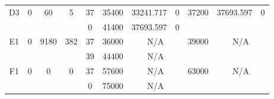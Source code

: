\begin{sidewaystable}
\begin{tabular}{c||c|c|c||c|c|c|c||c|c|c}
         &
        
      \\
      \hline
      \multirow{2}{*}{D3} &
      \multirow{2}{*}{0} &
      \multirow{2}{*}{60} &
      \multirow{2}{*}{5} &
      37 &
      35400 &
        33241.717 &
        0 &
      \multirow{2}{*}{37200} &
        \multirow{2}{*}{37693.597} &
        \multirow{2}{*}{0}
      \\
      \cline{5-8}
       &
       &
       &
       &
      0 &
      41400 &
        37693.597 &
        0 &
      
         &
        
      \\
      \hline
      \multirow{2}{*}{E1} &
      \multirow{2}{*}{0} &
      \multirow{2}{*}{9180} &
      \multirow{2}{*}{382} &
      37 &
      36000 &
        \multicolumn{2}{|c||}{N/A} &
      \multirow{2}{*}{39000} &
        \multicolumn{2}{c}{\multirow{2}{*}{N/A}}
      \\
      \cline{5-8}
       &
       &
       &
       &
      39 &
      44400 &
        \multicolumn{2}{|c||}{N/A} &
      
        
      \\
      \hline
      \multirow{2}{*}{F1} &
      \multirow{2}{*}{0} &
      \multirow{2}{*}{0} &
      \multirow{2}{*}{0} &
      37 &
      57600 &
        \multicolumn{2}{|c||}{N/A} &
      \multirow{2}{*}{63000} &
        \multicolumn{2}{c}{\multirow{2}{*}{N/A}}
      \\
      \cline{5-8}
       &
       &
       &
       &
      0 &
      75000 &
        \multicolumn{2}{|c||}{N/A} &
      
        
      \\
\end{tabular}
\label{table:RASDATASET1} 
\end{sidewaystable}